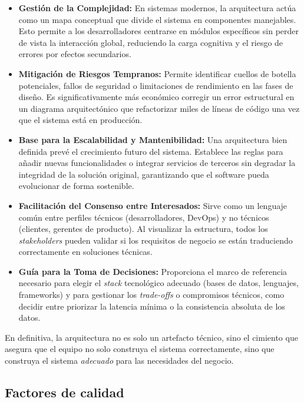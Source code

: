 \begin{itemize}
    \item \textbf{Gestión de la Complejidad:} En sistemas modernos, la arquitectura actúa como un mapa conceptual que divide el sistema en componentes manejables. Esto permite a los desarrolladores centrarse en módulos específicos sin perder de vista la interacción global, reduciendo la carga cognitiva y el riesgo de errores por efectos secundarios.
    
    \item \textbf{Mitigación de Riesgos Tempranos:} Permite identificar cuellos de botella potenciales, fallos de seguridad o limitaciones de rendimiento en las fases de diseño. Es significativamente más económico corregir un error estructural en un diagrama arquitectónico que refactorizar miles de líneas de código una vez que el sistema está en producción.
    
    \item \textbf{Base para la Escalabilidad y Mantenibilidad:} Una arquitectura bien definida prevé el crecimiento futuro del sistema. Establece las reglas para añadir nuevas funcionalidades o integrar servicios de terceros sin degradar la integridad de la solución original, garantizando que el software pueda evolucionar de forma sostenible.
    
    \item \textbf{Facilitación del Consenso entre Interesados:} Sirve como un lenguaje común entre perfiles técnicos (desarrolladores, DevOps) y no técnicos (clientes, gerentes de producto). Al visualizar la estructura, todos los \textit{stakeholders} pueden validar si los requisitos de negocio se están traduciendo correctamente en soluciones técnicas.
    
    \item \textbf{Guía para la Toma de Decisiones:} Proporciona el marco de referencia necesario para elegir el \textit{stack} tecnológico adecuado (bases de datos, lenguajes, frameworks) y para gestionar los \textit{trade-offs} o compromisos técnicos, como decidir entre priorizar la latencia mínima o la consistencia absoluta de los datos.
\end{itemize}

En definitiva, la arquitectura no es solo un artefacto técnico, sino el cimiento que asegura que el equipo no solo construya el sistema correctamente, sino que construya el sistema \textit{adecuado} para las necesidades del negocio.


\subsection{Factores de calidad}

